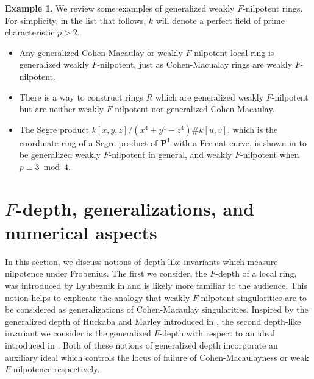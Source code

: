 \documentclass{amsproc}
\theoremstyle{definition}
\newtheorem{example}[theorem]{Example}
\theoremstyle{remark}
\numberwithin{equation}{section}
\begin{document}
\begin{example}  We review some examples of generalized weakly $F$-nilpotent rings. For simplicity, in the list that follows, $k$ will denote a perfect field of prime characteristic $p>2$.
\begin{itemize}
\item Any generalized Cohen-Macaulay or weakly $F$-nilpotent local ring is generalized weakly $F$-nilpotent, just as Cohen-Macualay rings are weakly $F$-nilpotent. \begin{center}
\end{center} 
\item  There is a way \cite[Ex. 4.8]{KMPS23} to construct rings $R$ which are generalized weakly $F$-nilpotent but are neither weakly $F$-nilpotent nor generalized Cohen-Macaulay. 
\item The Segre product $k[x,y,z]/(x^4+y^4-z^4) \# k[u,v]$, which is the coordinate ring of a Segre product of $\mathbf{P}^1$ with a Fermat curve, is shown in \cite[Ex. 5.6]{MM24} to be generalized weakly $F$-nilpotent in general, and weakly $F$-nilpotent when $p \equiv 3 \bmod 4$. 
\end{itemize}
\end{example}

\section{\texorpdfstring{$F$}{F}-depth, generalizations, and numerical aspects}


In this section, we discuss notions of depth-like invariants which measure nilpotence under Frobenius. The first we consider, the $F$-depth of a local ring, was introduced by Lyubeznik in \cite{Lyu06} and is likely more familiar to the audience. This notion helps to explicate the analogy that weakly $F$-nilpotent singularities are to be considered as generalizations of Cohen-Macaulay singularities. Inspired by the generalized depth of Huckaba and Marley introduced in \cite{HM94}, the second depth-like invariant we consider is the generalized $F$-depth with respect to an ideal introduced in \cite{CMM23}. Both of these notions of generalized depth incorporate an auxiliary ideal which controls the locus of failure of Cohen-Macaulayness or weak $F$-nilpotence respectively.
\end{document}
